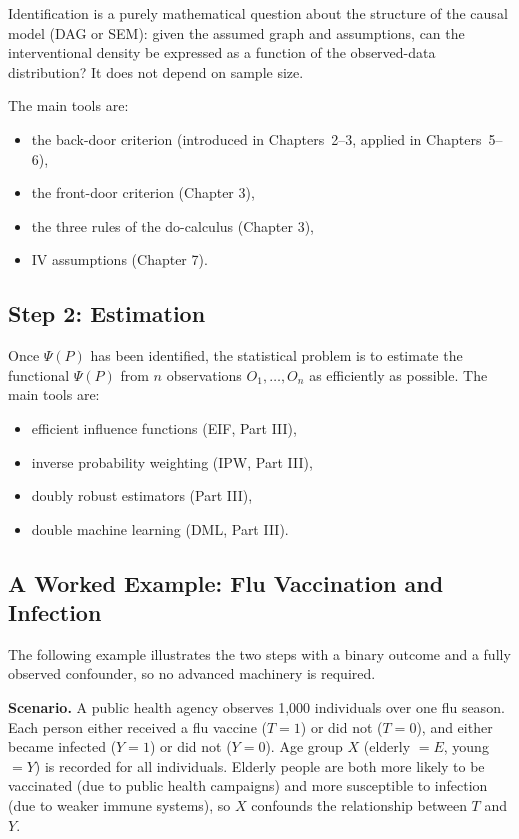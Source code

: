 \documentclass[master.tex]{subfiles}
\begin{document}
Identification is a purely mathematical question about the structure of the
causal model (DAG or SEM): given the assumed graph and assumptions, can the
interventional density be expressed as a function of the observed-data
distribution?  It does not depend on sample size. 

The main tools are:
\begin{itemize}
  \item the back-door criterion (introduced in Chapters~2--3, applied in Chapters~5--6),
  \item the front-door criterion (Chapter 3),
  \item the three rules of the do-calculus (Chapter 3),
  \item IV assumptions (Chapter 7).
\end{itemize}

\subsection{Step 2: Estimation}

Once $\Psi(P)$ has been identified, the statistical problem is to estimate
the functional $\Psi(P)$ from $n$ observations $O_1,\dots,O_n$ as
efficiently as possible.  The main tools are:
\begin{itemize}
  \item efficient influence functions (EIF, Part III),
  \item inverse probability weighting (IPW, Part III),
  \item doubly robust estimators (Part III),
  \item double machine learning (DML, Part III).
\end{itemize}

\subsection{A Worked Example: Flu Vaccination and Infection}
\label{w1:subsec:simpson}

The following example illustrates the two steps with a binary outcome and a
fully observed confounder, so no advanced machinery is required.

\medskip
\noindent\textbf{Scenario.}
A public health agency observes 1{,}000 individuals over one flu season.
Each person either received a flu vaccine ($T=1$) or did not ($T=0$), and
either became infected ($Y=1$) or did not ($Y=0$).  Age group $X$
(elderly $= E$, young $= Y$) is recorded for all individuals.
Elderly people are both more likely to be vaccinated (due to public health
campaigns) and more susceptible to infection (due to weaker immune systems),
so $X$ confounds the relationship between $T$ and $Y$.
\end{document}

